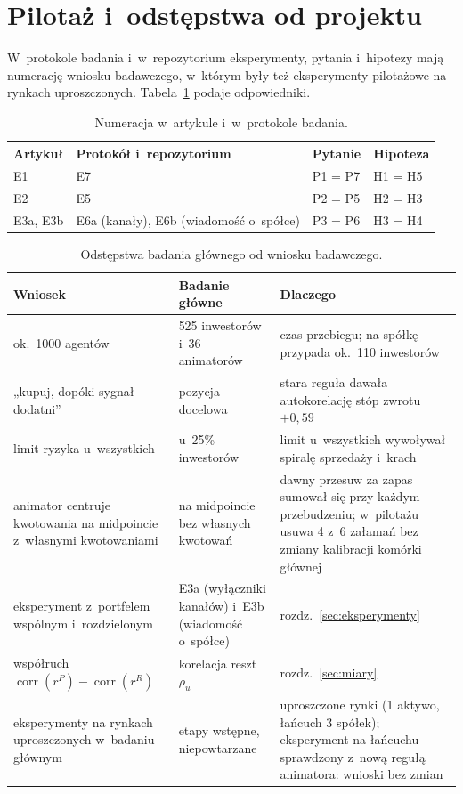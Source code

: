 \documentclass[11pt,a4paper]{article}
\begin{document}
\clearpage
\appendix
\section{Pilotaż i~odstępstwa od projektu}\label{sec:odstepstwa}
W~protokole badania i~w~repozytorium eksperymenty, pytania i~hipotezy mają numerację wniosku badawczego, w~którym
były też eksperymenty pilotażowe na rynkach uproszczonych. Tabela~\ref{tab:numeracja} podaje odpowiedniki.

\begin{table}[!htbp]
\centering\small
\caption{Numeracja w~artykule i~w~protokole badania.}\label{tab:numeracja}
\begin{tabular}{@{}l l l l@{}}
\toprule
Artykuł & Protokół i~repozytorium & Pytanie & Hipoteza \\
\midrule
E1 & E7 & P1 = P7 & H1 = H5 \\
E2 & E5 & P2 = P5 & H2 = H3 \\
E3a, E3b & E6a (kanały), E6b (wiadomość o~spółce) & P3 = P6 & H3 = H4 \\
\bottomrule
\end{tabular}
\end{table}

\begin{table}[!htbp]
\centering\small
\caption{Odstępstwa badania głównego od wniosku badawczego.}\label{tab:odstepstwa}
\begin{tabularx}{\textwidth}{@{}Y Y Y@{}}
\toprule
Wniosek & Badanie główne & Dlaczego \\
\midrule
ok.~1000 agentów & 525 inwestorów i~36 animatorów & czas przebiegu; na spółkę przypada ok.~110 inwestorów \\ \addlinespace[3pt]
„kupuj, dopóki sygnał dodatni” & pozycja docelowa & stara reguła dawała autokorelację stóp zwrotu $+0{,}59$ \\ \addlinespace[3pt]
limit ryzyka u~wszystkich & u~25\% inwestorów & limit u~wszystkich wywoływał spiralę sprzedaży i~krach \\ \addlinespace[3pt]
animator centruje kwotowania na midpoincie z~własnymi kwotowaniami & na midpoincie bez własnych kwotowań & dawny
  przesuw za zapas sumował się przy każdym przebudzeniu; w~pilotażu usuwa 4 z~6 załamań bez zmiany kalibracji
  komórki głównej \\ \addlinespace[3pt]
eksperyment z~portfelem wspólnym i~rozdzielonym & E3a (wyłączniki kanałów) i~E3b (wiadomość o~spółce) &
  rozdz.~\ref{sec:eksperymenty} \\ \addlinespace[3pt]
współruch $\operatorname{corr}(r^P) - \operatorname{corr}(r^R)$ & korelacja reszt $\rho_u$ &
  rozdz.~\ref{sec:miary} \\ \addlinespace[3pt]
eksperymenty na rynkach uproszczonych w~badaniu głównym & etapy wstępne, niepowtarzane & uproszczone rynki
  (1 aktywo, łańcuch 3 spółek); eksperyment na łańcuchu sprawdzony z~nową regułą animatora: wnioski bez zmian \\
\bottomrule
\end{tabularx}
\end{table}
\end{document}
